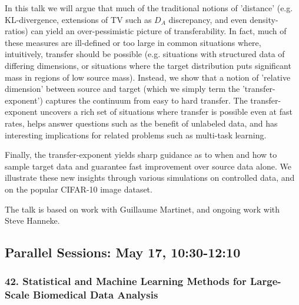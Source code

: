 \begin{itemize}
In this talk we will argue that much of the traditional notions of 'distance' (e.g. KL-divergence, extensions of 
TV such as $D_A$ discrepancy, and even density-ratios) can yield an over-pessimistic picture of transferability. 
In fact, much of these measures are ill-defined or too large in common situations where, intuitively, transfer should be possible (e.g. situations with structured data of differing dimensions, or situations where the target distribution puts significant mass in regions of low source mass). Instead, we show that a notion of 'relative dimension' between source and target (which we simply term the 'transfer-exponent') captures the continuum from easy to hard transfer. The transfer-exponent uncovers a rich set of situations where transfer is possible even at fast rates, helps answer questions such as the benefit of unlabeled data, and has interesting implications for related problems such as multi-task learning. 

Finally, the transfer-exponent yields sharp guidance as to when and how to sample target data and guarantee fast improvement over source data alone. We illustrate these new insights through various simulations on controlled data, and on the popular CIFAR-10 image dataset. 

The talk is based on work with Guillaume Martinet, and ongoing work with Steve Hanneke.

\end{itemize}

\subsection*{Parallel Sessions: May 17, 10:30-12:10}

\subsubsection*{42. Statistical and Machine Learning Methods for Large-Scale Biomedical Data Analysis}

